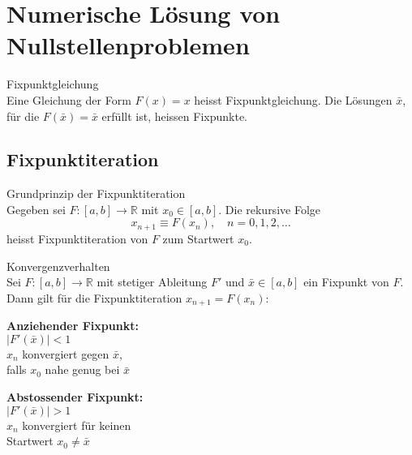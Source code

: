 \section{Numerische Lösung von Nullstellenproblemen}

\begin{definition}{Fixpunktgleichung}\\
Eine Gleichung der Form $F(x)=x$ heisst Fixpunktgleichung. Die Lösungen $\bar{x}$, für die $F(\bar{x})=\bar{x}$ erfüllt ist, heissen Fixpunkte.
\end{definition}

\subsection{Fixpunktiteration}

\begin{concept}{Grundprinzip der Fixpunktiteration}\\
Gegeben sei $F:[a,b] \rightarrow \mathbb{R}$ mit $x_0 \in [a,b]$. Die rekursive Folge
$$x_{n+1} \equiv F(x_n), \quad n=0,1,2,\ldots$$
heisst Fixpunktiteration von $F$ zum Startwert $x_0$.
\end{concept}

\begin{theorem}{Konvergenzverhalten}\\
Sei $F:[a,b] \rightarrow \mathbb{R}$ mit stetiger Ableitung $F'$ und $\bar{x} \in [a,b]$ ein Fixpunkt von $F$. Dann gilt für die Fixpunktiteration $x_{n+1}=F(x_n)$:
\vspace{1mm}\\
\begin{minipage}[t]{0.45\textwidth}
    \textbf{Anziehender Fixpunkt:}\\
    $|F'(\bar{x})| < 1$\\
    $x_n$ konvergiert gegen $\bar{x}$,\\
    falls $x_0$ nahe genug bei $\bar{x}$
\end{minipage}
\hspace{3mm}
\begin{minipage}[t]{0.45\textwidth}
    \textbf{Abstossender Fixpunkt:}\\
    $|F'(\bar{x})| > 1$\\
    $x_n$ konvergiert für keinen\\
    Startwert $x_0 \neq \bar{x}$
\end{minipage}
\end{theorem}

